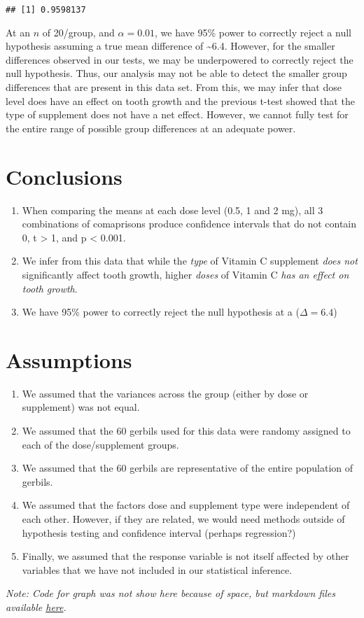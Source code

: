 \documentclass[]{article}
\begin{document}
\begin{verbatim}
## [1] 0.9598137
\end{verbatim}

At an \(n\) of 20/group, and \(\alpha=0.01\), we have 95\% power to
correctly reject a null hypothesis assuming a true mean difference of
\textasciitilde{}6.4. However, for the smaller differences observed in
our tests, we may be underpowered to correctly reject the null
hypothesis. Thus, our analysis may not be able to detect the smaller
group differences that are present in this data set. From this, we may
infer that dose level does have an effect on tooth growth and the
previous t-test showed that the type of supplement does not have a net
effect. However, we cannot fully test for the entire range of possible
group differences at an adequate power.

\section{Conclusions}\label{conclusions}

\begin{enumerate}
\def\labelenumi{\arabic{enumi}.}
\itemsep1pt\parskip0pt
\item
  When comparing the means at each dose level (0.5, 1 and 2 mg), all 3
  combinations of comaprisons produce confidence intervals that do not
  contain 0, t \textgreater{} 1, and p \textless{} 0.001.
\item
  We infer from this data that while the \emph{type} of Vitamin C
  supplement \emph{does not} significantly affect tooth growth, higher
  \emph{doses} of Vitamin C \emph{has an effect on tooth growth}.
\item
  We have 95\% power to correctly reject the null hypothesis at a
  (\(\Delta = 6.4\))
\end{enumerate}

\section{Assumptions}\label{assumptions}

\begin{enumerate}
\def\labelenumi{\arabic{enumi}.}
\itemsep1pt\parskip0pt
\item
  We assumed that the variances across the group (either by dose or
  supplement) was not equal.
\item
  We assumed that the 60 gerbils used for this data were randomy
  assigned to each of the dose/supplement groups.
\item
  We assumed that the 60 gerbils are representative of the entire
  population of gerbils.
\item
  We assumed that the factors dose and supplement type were independent
  of each other. However, if they are related, we would need methods
  outside of hypothesis testing and confidence interval (perhaps
  regression?)
\item
  Finally, we assumed that the response variable is not itself affected
  by other variables that we have not included in our statistical
  inference.
\end{enumerate}

\emph{Note: Code for graph was not show here because of space, but
markdown files available
\href{https://github.com/anandi42/Stat_Inf/blob/master/CourseProj_part2.Rmd}{here}.}
\end{document}
